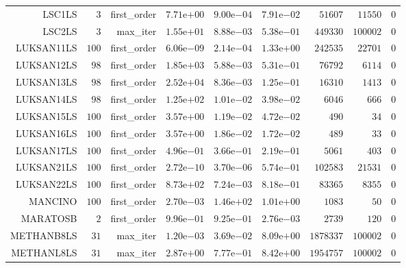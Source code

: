 \begin{longtable}{rrrrrrrrr}
LSC1LS & \(     3\) & first\_order & \( 7.71\)e\(+00\) & \( 9.00\)e\(-04\) & \( 7.91\)e\(-02\) & \( 51607\) & \( 11550\) & \(     0\) \\
LSC2LS & \(     3\) & max\_iter & \( 1.55\)e\(+01\) & \( 8.88\)e\(-03\) & \( 5.38\)e\(-01\) & \(449330\) & \(100002\) & \(     0\) \\
LUKSAN11LS & \(   100\) & first\_order & \( 6.06\)e\(-09\) & \( 2.14\)e\(-04\) & \( 1.33\)e\(+00\) & \(242535\) & \( 22701\) & \(     0\) \\
LUKSAN12LS & \(    98\) & first\_order & \( 1.85\)e\(+03\) & \( 5.88\)e\(-03\) & \( 5.31\)e\(-01\) & \( 76792\) & \(  6114\) & \(     0\) \\
LUKSAN13LS & \(    98\) & first\_order & \( 2.52\)e\(+04\) & \( 8.36\)e\(-03\) & \( 1.25\)e\(-01\) & \( 16310\) & \(  1413\) & \(     0\) \\
LUKSAN14LS & \(    98\) & first\_order & \( 1.25\)e\(+02\) & \( 1.01\)e\(-02\) & \( 3.98\)e\(-02\) & \(  6046\) & \(   666\) & \(     0\) \\
LUKSAN15LS & \(   100\) & first\_order & \( 3.57\)e\(+00\) & \( 1.19\)e\(-02\) & \( 4.72\)e\(-02\) & \(   490\) & \(    34\) & \(     0\) \\
LUKSAN16LS & \(   100\) & first\_order & \( 3.57\)e\(+00\) & \( 1.86\)e\(-02\) & \( 1.72\)e\(-02\) & \(   489\) & \(    33\) & \(     0\) \\
LUKSAN17LS & \(   100\) & first\_order & \( 4.96\)e\(-01\) & \( 3.66\)e\(-01\) & \( 2.19\)e\(-01\) & \(  5061\) & \(   403\) & \(     0\) \\
LUKSAN21LS & \(   100\) & first\_order & \( 2.72\)e\(-10\) & \( 3.70\)e\(-06\) & \( 5.74\)e\(-01\) & \(102583\) & \( 21531\) & \(     0\) \\
LUKSAN22LS & \(   100\) & first\_order & \( 8.73\)e\(+02\) & \( 7.24\)e\(-03\) & \( 8.18\)e\(-01\) & \( 83365\) & \(  8355\) & \(     0\) \\
MANCINO & \(   100\) & first\_order & \( 2.70\)e\(-03\) & \( 1.46\)e\(+02\) & \( 1.01\)e\(+00\) & \(  1083\) & \(    50\) & \(     0\) \\
MARATOSB & \(     2\) & first\_order & \( 9.96\)e\(-01\) & \( 9.25\)e\(-01\) & \( 2.76\)e\(-03\) & \(  2739\) & \(   120\) & \(     0\) \\
METHANB8LS & \(    31\) & max\_iter & \( 1.20\)e\(-03\) & \( 3.69\)e\(-02\) & \( 8.09\)e\(+00\) & \(1878337\) & \(100002\) & \(     0\) \\
METHANL8LS & \(    31\) & max\_iter & \( 2.87\)e\(+00\) & \( 7.77\)e\(-01\) & \( 8.42\)e\(+00\) & \(1954757\) & \(100002\) & \(     0\) \\

\end{longtable}

